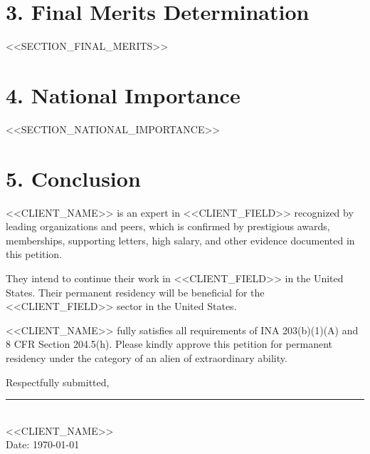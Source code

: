 \documentclass[12pt,letterpaper]{article}
\newcommand{\clientname}{<<CLIENT_NAME>>}
\newcommand{\clientfield}{<<CLIENT_FIELD>>}
\begin{document}
\section*{3. Final Merits Determination}

<<SECTION_FINAL_MERITS>>

\section*{4. National Importance}

<<SECTION_NATIONAL_IMPORTANCE>>

\section*{5. Conclusion}

\clientname{} is an expert in \clientfield{} recognized by leading organizations and peers, which is confirmed by prestigious awards, memberships, supporting letters, high salary, and other evidence documented in this petition.

They intend to continue their work in \clientfield{} in the United States. Their permanent residency will be beneficial for the \clientfield{} sector in the United States.

\clientname{} fully satisfies all requirements of INA 203(b)(1)(A) and 8 CFR Section 204.5(h). Please kindly approve this petition for permanent residency under the category of an alien of extraordinary ability.

\vspace{2em}

\noindent Respectfully submitted,

\vspace{3em}

\noindent\rule{6cm}{0.4pt}\\
\clientname\\
Date: \today
\end{document}
